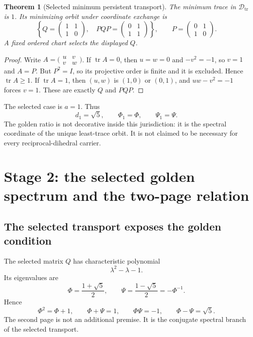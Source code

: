 \documentclass[11pt]{article}
\newtheorem{theorem}{Theorem}[section]
\newcommand{\tr}{\operatorname{tr}}
\newcommand{\Dtr}{\mathcal D_{\mathrm{tr}}}
\begin{document}
\begin{theorem}[Selected minimum persistent transport]
The minimum trace in $\Dtr$ is $1$. Its minimizing orbit under coordinate exchange is
\[
\left\{
Q=\begin{pmatrix}1&1\\1&0\end{pmatrix},
\quad
PQP=\begin{pmatrix}0&1\\1&1\end{pmatrix}
\right\},
\qquad
P=\begin{pmatrix}0&1\\1&0\end{pmatrix}.
\]
A fixed ordered chart selects the displayed $Q$.
\end{theorem}
\begin{proof}
Write $A=\bigl(\begin{smallmatrix}u&v\\v&w\end{smallmatrix}\bigr)$. If $\tr A=0$, then $u=w=0$ and $-v^2=-1$, so $v=1$ and $A=P$. But $P^2=I$, so its projective order is finite and it is excluded. Hence $\tr A\ge1$. If $\tr A=1$, then $(u,w)$ is $(1,0)$ or $(0,1)$, and $uw-v^2=-1$ forces $v=1$. These are exactly $Q$ and $PQP$.
\end{proof}

The selected case is $a=1$. Thus
\[
d_1=\sqrt5,
\qquad
\Phi_1=\Phi,
\qquad
\Psi_1=\Psi.
\]
The golden ratio is not decorative inside this jurisdiction: it is the spectral coordinate of the unique least-trace orbit. It is not claimed to be necessary for every reciprocal-dihedral carrier.

\section{Stage 2: the selected golden spectrum and the two-page relation}

\subsection{The selected transport exposes the golden condition}

The selected matrix $Q$ has characteristic polynomial
\[
\lambda^2-\lambda-1.
\]
Its eigenvalues are
\[
\Phi=\frac{1+\sqrt5}{2},
\qquad
\Psi=\frac{1-\sqrt5}{2}=-\Phi^{-1}.
\]
Hence
\[
\boxed{
\Phi^2=\Phi+1,
\qquad
\Phi+\Psi=1,
\qquad
\Phi\Psi=-1,
\qquad
\Phi-\Psi=\sqrt5.
}
\]
The second page is not an additional premise. It is the conjugate spectral branch of the selected transport.
\end{document}
